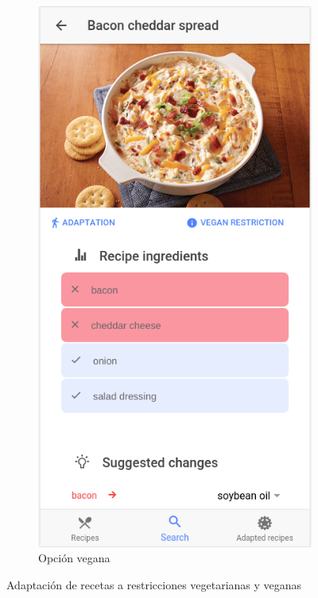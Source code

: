 \begin{figure}[H]
\begin{subfigure}[b]{0.308\linewidth}
    \end{subfigure}
    \begin{subfigure}[b]{0.31\linewidth}
        \includegraphics[width=\linewidth]{imagenes/app/pantallas/ejemplo6.png}
        \caption{Opción vegana}
        \label{fig:ejemplo6}
    \end{subfigure}
    \caption{Adaptación de recetas a restricciones vegetarianas y veganas}
    \label{fig:todos}
\end{figure} 

